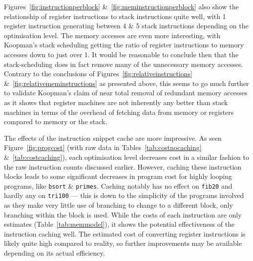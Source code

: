 Figures~\ref{fig:instructionperblock} \&~\ref{fig:meminstructionperblock} also
show the relationship of register instructions to stack instructions quite well,
with 1 register instruction generating between 4 \& 5 stack instructions
depending on the optimisation level. The memory accesses are even more
interesting, with Koopman's stack scheduling getting the ratio of register
instructions to memory accesses down to just over 1. It would be reasonable to
conclude then that the stack-scheduling does in fact remove many of the
unnecessary memory accesses. Contrary to the conclusions of
Figures~\ref{fig:relativeinstructions} \&~\ref{fig:relativememinstructions} as
presented above, this seems to go much further to validate Koopman's claim of
near total removal of redundant memory accesses as it shows that register
machines are not inherently any better than stack machines in terms of the
overhead of fetching data from memory or registers compared to memory or the
stack.

The effects of the instruction snippet cache are more impressive. As seen
Figure~\ref{fig:progcost} (with raw data in Tables~\ref{tab:costnocaching}
\&~\ref{tab:costcaching}), each optimisation level decreases cost in a similar
fashion to the raw instruction counts discussed earlier. However, caching these
instruction blocks leads to some significant decreases in program cost for
highly looping programs, like \texttt{bsort} \& \texttt{primes}. Caching notably
has no effect on \texttt{fib20} and hardly any on \texttt{tri100} --- this is
down to the simplicity of the programs involved as they make very little use of
branching to change to a different block, only branching within the block is
used. While the costs of each instruction are only estimates
(Table~\ref{tab:memmodel}), it shows the potential effectiveness of the
instruction caching well. The estimated cost of converting register instructions
is likely quite high compared to reality, so further improvements may be
available depending on its actual efficiency.

